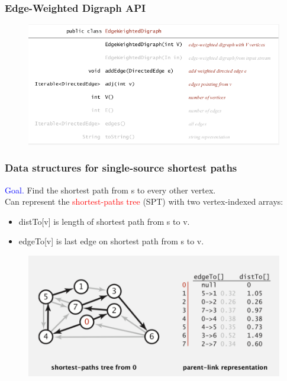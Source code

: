 \documentclass[11pt]{beamer}
\begin{document}
\begin{frame}
	\frametitle	{Edge-Weighted Digraph API} 
	\begin{figure}
		\centering
		\includegraphics[width=1.05\linewidth]{"Screenshot 2020-12-06 at 3.42.49 PM"}
		\label{fig:screenshot-2020-12-06-at-3}
	\end{figure}	
\end{frame}

\begin{frame}
	\frametitle	{Data structures for single-source shortest paths
	} 
   \textcolor{blue}{Goal.} Find the shortest path from s to every other vertex.
  \\
   Can represent the \textcolor{red}{shortest-paths tree} (SPT) with two vertex-indexed arrays: 
   \begin{itemize}
   	\item distTo[v] is length of shortest path from s to v.
   	\item edgeTo[v] is last edge on shortest path from s to v.
   \end{itemize}	
   \begin{figure}
   	\centering
   	\includegraphics[width=0.8\linewidth]{"Screenshot 2020-12-06 at 7.25.46 PM"}
   	\label{fig:screenshot-2020-12-06-at-7}
   \end{figure}  
\end{frame}
\end{document}
